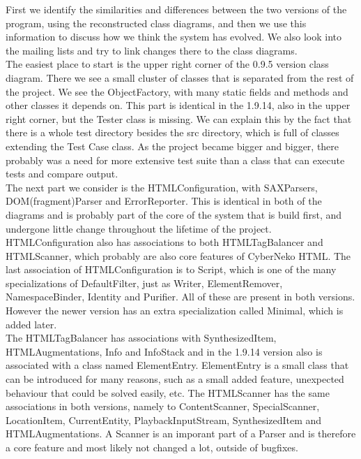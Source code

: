 \documentclass[a4paper,11pt]{article}
\begin{document}
			First we identify the similarities and differences between the two versions of the program, using the reconstructed class diagrams, and then we use this information to discuss how we think the system has evolved. We also look into the mailing lists and try to link changes there to the class diagrams. \\
			
			The easiest place to start is the upper right corner of the 0.9.5 version class diagram. There we see a small cluster of classes that is separated from the rest of the project. We see the ObjectFactory, with many static fields and methods and other classes it depends on. This part is identical in the 1.9.14, also in the upper right corner, but the Tester class is missing. We can explain this by the fact that there is a whole test directory besides the src directory, which is full of classes extending the Test Case class. As the project became bigger and bigger, there probably was a need for more extensive test suite than a class that can execute tests and compare output. \\

			The next part we consider is the HTMLConfiguration, with SAXParsers, DOM(fragment)Parser and ErrorReporter. This is identical in both of the diagrams and is probably part of the core of the system that is build first, and undergone little change throughout the lifetime of the project. HTMLConfiguration also has associations to both HTMLTagBalancer and HTMLScanner, which probably are also core features of CyberNeko HTML. The last association of HTMLConfiguration is to Script, which is one of the many specializations of DefaultFilter, just as Writer, ElementRemover, NamespaceBinder, Identity and Purifier. All of these are present in both versions. However the newer version has an extra specialization called Minimal, which is added later. \\

			The HTMLTagBalancer has associations with SynthesizedItem, HTMLAugmentations, Info and InfoStack and in the 1.9.14 version also is associated with a class named ElementEntry. ElementEntry is a small class that can be introduced for many reasons, such as a small added feature, unexpected behaviour that could be solved easily, etc. The HTMLScanner has the same associations in both versions, namely to ContentScanner, SpecialScanner, LocationItem, CurrentEntity, PlaybackInputStream, SynthesizedItem and HTMLAugmentations. A Scanner is an imporant part of a Parser and is therefore a core feature and most likely not changed a lot, outside of bugfixes.\\
\end{document}

